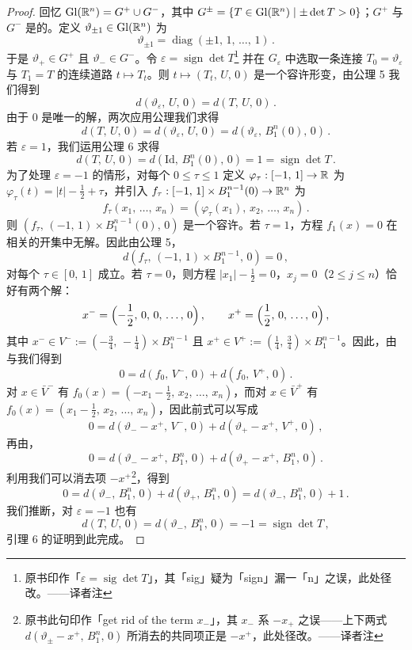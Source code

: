 \begin{proof}
回忆 $\mathrm{Gl}(\mathbb{R}^n)=G^{+}\cup G^{-}$，其中 $G^{\pm}=\{T\in\mathrm{Gl}(\mathbb{R}^n)\mid \pm\det T>0\}$；$G^{+}$ 与 $G^{-}$ 是\trPathConnected{}的。定义 $\vartheta_{\pm 1}\in\mathrm{Gl}(\mathbb{R}^n)$ 为
\[\vartheta_{\pm 1}=\operatorname{diag}(\pm 1,\,1,\,\ldots,\,1)\,.\]
于是 $\vartheta_{+}\in G^{+}$ 且 $\vartheta_{-}\in G^{-}$。令 $\varepsilon=\operatorname{sign}\det T$\footnote{原书印作「$\varepsilon=\operatorname{sig}\det T$」，其「sig」疑为「sign」漏一「n」之误，此处径改。——译者注} 并在 $G_{\varepsilon}$ 中选取一条连接 $T_0=\vartheta_{\varepsilon}$ 与 $T_1=T$ 的连续道路 $t\mapsto T_t$。则 $t\mapsto(T_t,\,U,\,0)$ 是一个容许形变，由公理 5 我们得到
\[d(\vartheta_{\varepsilon},\,U,\,0)=d(T,\,U,\,0)\,.\]
由于 $0$ 是唯一的解，两次应用\trExcision{}公理我们求得
\[d(T,\,U,\,0)=d(\vartheta_{\varepsilon},\,U,\,0)=d(\vartheta_{\varepsilon},\,B_1^n(0),\,0)\,.\]
若 $\varepsilon=1$，我们运用公理 6 求得
\[d(T,\,U,\,0)=d(\mathrm{Id},\,B_1^n(0),\,0)=1=\operatorname{sign}\det T\,.\]
为了处理 $\varepsilon=-1$ 的情形，对每个 $0\leq\tau\leq 1$ 定义 $\varphi_{\tau}:[-1,\,1]\to\mathbb{R}$ 为 $\varphi_{\tau}(t)=|t|-\tfrac{1}{2}+\tau$，并引入 $f_{\tau}:[-1,\,1]\times B_1^{n-1}(0)\to\mathbb{R}^n$ 为
\[f_{\tau}(x_1,\,\ldots,\,x_n)=(\varphi_{\tau}(x_1),\,x_2,\,\ldots,\,x_n)\,.\]
则 $(f_{\tau},\,(-1,\,1)\times B_1^{n-1}(0),\,0)$ 是一个容许\trHomotopy。若 $\tau=1$，方程 $f_1(x)=0$ 在相关的开集中无解。因此由公理 5，
\[d(f_{\tau},\,(-1,\,1)\times B_1^{n-1},\,0)=0\,,\]
对每个 $\tau\in[0,\,1]$ 成立。若 $\tau=0$，则方程 $|x_1|-\tfrac{1}{2}=0$，$x_j=0$（$2\leq j\leq n$）恰好有两个解：
\[x^{-}=\Bigl(-\frac{1}{2},\,0,\,0,\,\ldots,\,0\Bigr)\,,\qquad x^{+}=\Bigl(\frac{1}{2},\,0,\,\ldots,\,0\Bigr)\,,\]
其中 $x^{-}\in V^{-}:=(-\tfrac{3}{4},\,-\tfrac{1}{4})\times B_1^{n-1}$ 且 $x^{+}\in V^{+}:=(\tfrac{1}{4},\,\tfrac{3}{4})\times B_1^{n-1}$。因此，由\trExcision{}与\trAdditivity{}我们得到
\[0=d(f_0,\,V^{-},\,0)+d(f_0,\,V^{+},\,0)\,.\]
对 $x\in\bar{V}^{-}$ 有 $f_0(x)=(-x_1-\tfrac{1}{2},\,x_2,\,\ldots,\,x_n)$，而对 $x\in\bar{V}^{+}$ 有 $f_0(x)=(x_1-\tfrac{1}{2},\,x_2,\,\ldots,\,x_n)$，因此前式可以写成
\[0=d(\vartheta_{-}-x^{+},\,V^{-},\,0)+d(\vartheta_{+}-x^{+},\,V^{+},\,0)\,,\]
再由\trExcision，
\[0=d(\vartheta_{-}-x^{+},\,B_1^n,\,0)+d(\vartheta_{+}-x^{+},\,B_1^n,\,0)\,.\]
利用\trHomotopy\trInvariance{}我们可以消去项 $-x^{+}$\footnote{原书此句印作「get rid of the term $x_{-}$」，其 $x_{-}$ 系 $-x_{+}$ 之误——上下两式 $d(\vartheta_{\pm}-x^{+},\,B_{1}^{n},\,0)$ 所消去的共同项正是 $-x^{+}$，此处径改。——译者注}，得到
\[0=d(\vartheta_{-},\,B_1^n,\,0)+d(\vartheta_{+},\,B_1^n,\,0)=d(\vartheta_{-},\,B_1^n,\,0)+1\,.\]
我们推断，对 $\varepsilon=-1$ 也有
\[d(T,\,U,\,0)=d(\vartheta_{-},\,B_1^n,\,0)=-1=\operatorname{sign}\det T\,,\]
引理 6 的证明到此完成。
\end{proof}

